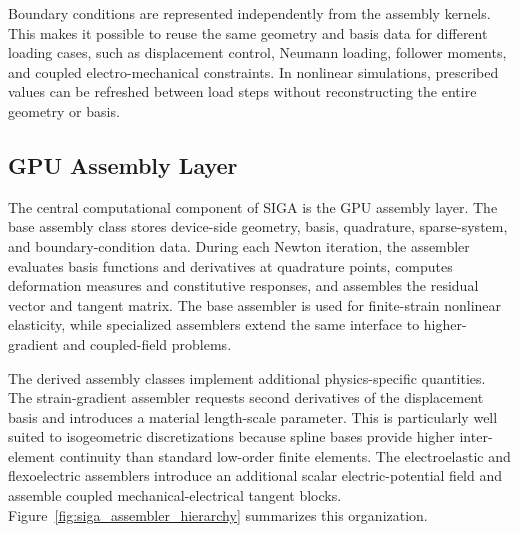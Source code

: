 \documentclass[11pt]{article}
\begin{document}
Boundary conditions are represented independently from the assembly kernels. This makes it possible to reuse the same geometry and basis data for different loading cases, such as displacement control, Neumann loading, follower moments, and coupled electro-mechanical constraints. In nonlinear simulations, prescribed values can be refreshed between load steps without reconstructing the entire geometry or basis.

\subsection{GPU Assembly Layer}

The central computational component of SIGA is the GPU assembly layer. The base assembly class stores device-side geometry, basis, quadrature, sparse-system, and boundary-condition data. During each Newton iteration, the assembler evaluates basis functions and derivatives at quadrature points, computes deformation measures and constitutive responses, and assembles the residual vector and tangent matrix. The base assembler is used for finite-strain nonlinear elasticity, while specialized assemblers extend the same interface to higher-gradient and coupled-field problems.

The derived assembly classes implement additional physics-specific quantities. The strain-gradient assembler requests second derivatives of the displacement basis and introduces a material length-scale parameter. This is particularly well suited to isogeometric discretizations because spline bases provide higher inter-element continuity than standard low-order finite elements. The electroelastic and flexoelectric assemblers introduce an additional scalar electric-potential field and assemble coupled mechanical-electrical tangent blocks. Figure~\ref{fig:siga_assembler_hierarchy} summarizes this organization.
\end{document}
